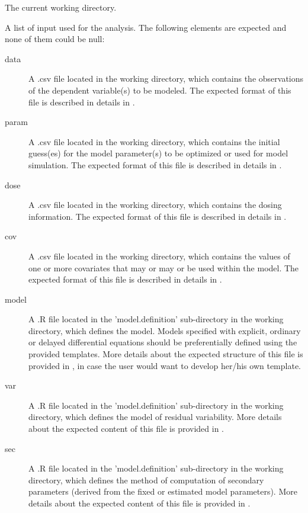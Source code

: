 \begin{Arguments}
\begin{ldescription}
\item[\code{curwd}] The current working directory.
\item[\code{files}] A list of input used for the analysis. The following elements are
expected and none of them could be null: \begin{description}

\item[data] A .csv file located in the working directory, which contains
the observations of the dependent variable(s) to be modeled. The
expected format of this file is described in details in
.
\item[param] A .csv file located in the working directory, which contains
the initial guess(es) for the model parameter(s) to be optimized or used
for model simulation. The expected format of this file is described in
details in .
\item[dose] A .csv file located in the working directory, which contains
the dosing information. The expected format of this file is described in
details in .
\item[cov] A .csv file located in the working directory, which contains
the values of one or more covariates that may or may or be used within
the model. The expected format of this file is described in details in
.
\item[model] A .R file located in the 'model.definition'
sub-directory in the working directory, which defines the model. Models
specified with explicit, ordinary or delayed differential equations
should be preferentially defined using the provided templates. More
details about the expected structure of this file is provided in
, in case the user would
want to develop her/his own template.
\item[var] A .R file located in the 'model.definition' sub-directory
in the working directory, which defines the model of residual
variability. More details about the expected content of this file is
provided in .
\item[sec] A .R file located in the 'model.definition' sub-directory
in the working directory, which defines the method of computation of
secondary parameters (derived from the fixed or estimated model
parameters). More details about the expected content of this file is
provided in .


\end{description}
\end{ldescription}
\end{Arguments}
